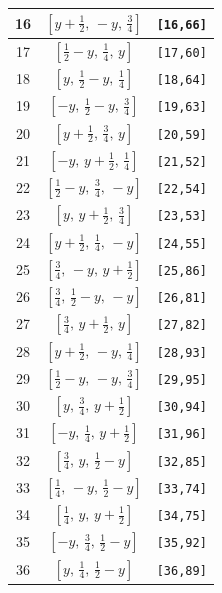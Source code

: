 \documentclass[fleqn,8pt]{jsarticle}
\begin{document}
\begin{longtable}{ccc}
16 & $\left[ y + \frac{1}{2},\, - y,\, \frac{3}{4} \right]$ & {\tt [16,66]} \\ \hline
17 & $\left[ \frac{1}{2} - y,\, \frac{1}{4},\, y \right]$ & {\tt [17,60]} \\ \hline
18 & $\left[ y,\, \frac{1}{2} - y,\, \frac{1}{4} \right]$ & {\tt [18,64]} \\ \hline
19 & $\left[ - y,\, \frac{1}{2} - y,\, \frac{3}{4} \right]$ & {\tt [19,63]} \\ \hline
20 & $\left[ y + \frac{1}{2},\, \frac{3}{4},\, y \right]$ & {\tt [20,59]} \\ \hline
21 & $\left[ - y,\, y + \frac{1}{2},\, \frac{1}{4} \right]$ & {\tt [21,52]} \\ \hline
22 & $\left[ \frac{1}{2} - y,\, \frac{3}{4},\, - y \right]$ & {\tt [22,54]} \\ \hline
23 & $\left[ y,\, y + \frac{1}{2},\, \frac{3}{4} \right]$ & {\tt [23,53]} \\ \hline
24 & $\left[ y + \frac{1}{2},\, \frac{1}{4},\, - y \right]$ & {\tt [24,55]} \\ \hline
25 & $\left[ \frac{3}{4},\, - y,\, y + \frac{1}{2} \right]$ & {\tt [25,86]} \\ \hline
26 & $\left[ \frac{3}{4},\, \frac{1}{2} - y,\, - y \right]$ & {\tt [26,81]} \\ \hline
27 & $\left[ \frac{3}{4},\, y + \frac{1}{2},\, y \right]$ & {\tt [27,82]} \\ \hline
28 & $\left[ y + \frac{1}{2},\, - y,\, \frac{1}{4} \right]$ & {\tt [28,93]} \\ \hline
29 & $\left[ \frac{1}{2} - y,\, - y,\, \frac{3}{4} \right]$ & {\tt [29,95]} \\ \hline
30 & $\left[ y,\, \frac{3}{4},\, y + \frac{1}{2} \right]$ & {\tt [30,94]} \\ \hline
31 & $\left[ - y,\, \frac{1}{4},\, y + \frac{1}{2} \right]$ & {\tt [31,96]} \\ \hline
32 & $\left[ \frac{3}{4},\, y,\, \frac{1}{2} - y \right]$ & {\tt [32,85]} \\ \hline
33 & $\left[ \frac{1}{4},\, - y,\, \frac{1}{2} - y \right]$ & {\tt [33,74]} \\ \hline
34 & $\left[ \frac{1}{4},\, y,\, y + \frac{1}{2} \right]$ & {\tt [34,75]} \\ \hline
35 & $\left[ - y,\, \frac{3}{4},\, \frac{1}{2} - y \right]$ & {\tt [35,92]} \\ \hline
36 & $\left[ y,\, \frac{1}{4},\, \frac{1}{2} - y \right]$ & {\tt [36,89]} \\ \hline

\end{longtable}
\end{document}
